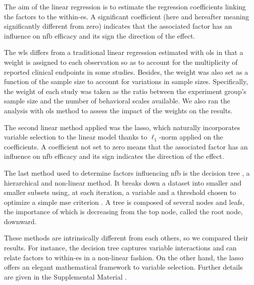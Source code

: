 The aim of the linear regression is to estimate the regression coefficients linking the factors
to the within-\gls{es}. A significant coefficient (here and hereafter meaning significantly different from zero) indicates
that the associated factor has an influence on \gls{nfb} efficacy and its sign the direction of the effect.

The \gls{wls} differs from a traditional linear regression estimated with \gls{ols} in that a weight is assigned 
to each observation so as to account for the multiplicity of reported clinical endpoints in some studies. Besides, the 
weight was also set as a function of the sample size to account for variations in sample sizes. Specifically, the weight of each study 
was taken as the ratio between the experiment group's sample size and the number of behavioral scales available.
We also ran the analysis with \gls{ols} method to assess the impact of the weights on the results. 

The second linear method applied was the \gls{lasso}, which naturally incorporates variable selection 
to the linear model thanks to $\ell_1$-norm applied on the coefficients. A coefficient not set to zero means that 
the associated factor has an influence on \gls{nfb} efficacy and its sign indicates the direction of the effect.

The last method used to determine factors influencing \gls{nfb} is the decision tree \citep{Quinlan1986}, a hierarchical 
and non-linear method. It breaks down a dataset into smaller and smaller subsets using, at each iteration, a variable and 
a threshold chosen to optimize a simple \gls{mse} criterion \citep{James2013}. A tree is composed of several nodes and leafs, 
the importance of which is decreasing from the top node, called the root node, downward. 

These methods are intrinsically different from each others, so we compared their results. For instance, the decision
tree captures variable interactions and can relate factors to within-\gls{es} in a non-linear fashion. On the other hand, the
\gls{lasso} offers an elegant mathematical framework to variable selection. Further details are given in the Supplemental Material
\citep{Supplementalmaterial}.















